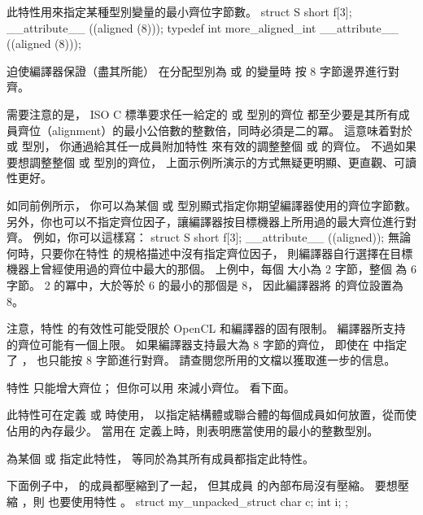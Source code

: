 此特性用來指定某種型別變量的最小齊位字節數。
\startclc
struct S { short f[3]; } __attribute__ ((aligned (8)));
typedef int more_aligned_int __attribute__ ((aligned (8)));
\stopclc

迫使編譯器保證（盡其所能）
在分配型別為  或  的變量時
{}按 8 字節邊界進行對齊。

需要注意的是， ISO C 標準要求任一給定的  或  型別的齊位
都至少要是其所有成員齊位（alignment）的最小公倍數的整數倍，同時必須是二的冪。
這意味着對於  或  型別，
你{}通過給其任一成員附加特性 
 來有效的調整整個  或  的齊位。
不過如果要想調整整個  或  型別的齊位，
上面示例所演示的方式無疑更明顯、更直觀、可讀性更好。

如同前例所示，
你可以為某個  或  型別顯式指定你期望編譯器使用的齊位字節數。
另外，你也可以不指定齊位因子，讓編譯器按目標機器上所用過的最大齊位進行對齊。
例如，你可以這樣寫：
\startclc
struct S { short f[3]; } __attribute__ ((aligned));
\stopclc
無論何時，只要你在特性  的規格描述中沒有指定齊位因子，
則編譯器自行選擇在目標機器上曾經使用過的齊位中最大的那個。
上例中，每個  大小為 2 字節，整個  為 6 字節。
 2 的冪中，大於等於 6 的最小的那個是 8，
因此編譯器將  的齊位設置為 8。

注意，特性  的有效性可能受限於 OpenCL 和編譯器的固有限制。
編譯器所支持的齊位可能有一個上限。
如果編譯器支持最大為 8 字節的齊位，
即使在  中指定了 ，
也只能按 8 字節進行對齊。
請查閱您所用的文檔以獲取進一步的信息。

特性  只能增大齊位；
但你可以用  來減小齊位。
看下面。
\stopclOption

此特性可在定義  或  時使用，
以指定結構體或聯合體的每個成員如何放置，從而使佔用的內存最少。
當用在  定義上時，則表明應當使用的最小的整數型別。

為某個  或  指定此特性，
等同於為其所有成員都指定此特性。

下面例子中，  的成員都壓縮到了一起，
但其成員  的內部布局沒有壓縮。
要想壓縮 ，則  也要使用特性 。
\startclc
struct my_unpacked_struct
{
	char c;
	int i;
};

